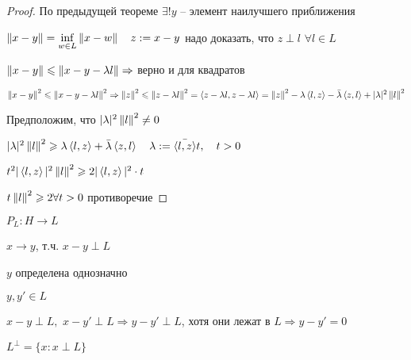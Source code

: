 \begin{proof}\thmslashn
	
	По предыдущей теореме $\exists! y$ -- элемент наилучшего приближения
	
	$\left\|x - y\right\| = \inf\limits_{w \in L} \left\|x - w\right\|\quad z:= x - y$ надо доказать, что $z \perp l\,\, \forall l \in L$
	
	$\left\|x - y\right\| \leqslant \left\|x -y - \lambda l\right\| \Rightarrow$ верно и для квадратов 
	
	$\left\|x - y\right\|^2 \leqslant \left\|x -y - \lambda l\right\|^2 \Rightarrow \left\|z\right\|^2 \leqslant \left\|z - \lambda l\right\|^2 = \left\langle z - \lambda l, z - \lambda l \right\rangle = \left\|z\right\|^2 - \lambda \left\langle l, z \right\rangle - \bar{\lambda} \left\langle z,l \right\rangle + |\lambda|^2\left\|l\right\|^2$
	
	Предположим, что $|\lambda|^2\left\|l\right\|^2\not = 0$ 
	
	$ |\lambda|^2\left\|l\right\|^2 \geqslant \lambda \left\langle l, z \right\rangle + \bar{\lambda}\left\langle z,l \right\rangle\quad \lambda := \bar{\left\langle l, z \right\rangle} t, \quad t > 0$
	
	$t^2|\left\langle l, z \right\rangle|^2 \left\|l\right\|^2 \geqslant 2|\left\langle l, z \right\rangle|^2\cdot t$ 
	
	$t \left\|l\right\|^2 \geqslant 2 \forall t > 0$ противоречие
	
\end{proof}

\begin{definition}\thmslashn
	
	$P_L : H \to L$
	
	$x\to y$, т.ч. $x - y \perp L$
	
\end{definition}

\begin{remark}\thmslashn
	
	$y$ определена однозначно
	
	$y, y' \in L$
	
	$x - y \perp L,\,\, x - y' \perp L \Rightarrow y - y' \perp L$, хотя они лежат в $L \Rightarrow y - y' = 0$
	
\end{remark}

\begin{definition}\thmslashn
	
	$L^\perp = \{x: x\perp L\}$
	
\end{definition}

